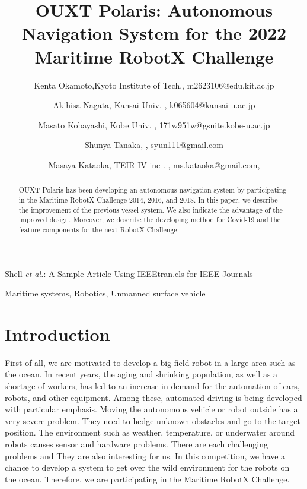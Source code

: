 \documentclass[lettersize,journal]{IEEEtran}
\begin{document}
\title{OUXT Polaris: Autonomous Navigation System for the 2022 Maritime RobotX Challenge}
\author{
    Kenta Okamoto,Kyoto Institute of Tech., m2623106@edu.kit.ac.jp \\ \and
    Akihisa Nagata, Kansai Univ. , k065604@kansai-u.ac.jp \\ \and
    Masato Kobayashi, Kobe Univ. , 171w951w@gsuite.kobe-u.ac.jp \\ \and
    Shunya Tanaka, , syun111@gmail.com \\ \and
    Masaya Kataoka, TEIR IV inc . , ms.kataoka@gmail.com,
}

%
{Shell \MakeLowercase{\textit{et al.}}: A Sample Article Using IEEEtran.cls for IEEE Journals}


\maketitle

\begin{abstract}
OUXT-Polaris has been developing an autonomous navigation system by participating in the 
Maritime RobotX Challenge 2014, 2016, and 2018. 
In this paper, we describe the improvement of the previous vessel system. 
We also indicate the advantage of the improved design.
Moreover, we describe the developing method for Covid-19 and the 
feature components for the next RobotX Challenge.
\end{abstract}

\begin{IEEEkeywords}
Maritime systems, Robotics, Unmanned surface vehicle
\end{IEEEkeywords}

\section{Introduction}
First of all, we are motivated to develop a big field robot in a large area such as the ocean.
In recent years, the aging and shrinking population, as well as a shortage of workers,
has led to an increase in demand for the automation of cars, robots, and other equipment.
Among these, automated driving is being developed with particular emphasis.
Moving the autonomous vehicle or robot outside has a very severe problem.
They need to hedge unknown obstacles and go to the target position.
The environment such as weather, temperature, or underwater around robots causes sensor and hardware problems.
There are each challenging problems and They are also interesting for us.  
In this competition, we have a chance to develop a system to get over the wild environment 
for the robots on the ocean. Therefore, we are participating in the Maritime RobotX Challenge.
\end{document}
